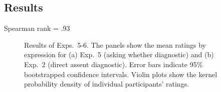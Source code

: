 \documentclass[times,linguex,xcolor]{glossa}
\begin{document}
    \subsection{Results}
    
    Spearman rank = .93

    \begin{figure}[h!]
      \centering
      


      \caption{Results of Exps.~5-6. The panels show the mean ratings by expression for (a) Exp.~5 (asking whether diagnostic) and (b) Exp.~2 (direct assent diagnostic). Error bars indicate 95\% bootstrapped confidence intervals. Violin plots show the kernel probability density of individual participants' ratings.}
      \label{fig:results2}
    \end{figure}
    
\end{document}
